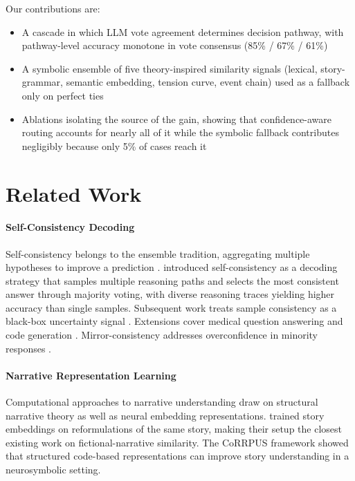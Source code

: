 \documentclass[11pt]{article}
\begin{document}
Our contributions are:
\begin{itemize}
    \item A cascade in which LLM vote agreement determines decision pathway, with pathway-level accuracy monotone in vote consensus (85\% / 67\% / 61\%)
    \item A symbolic ensemble of five theory-inspired similarity signals (lexical, story-grammar, semantic embedding, tension curve, event chain) used as a fallback only on perfect ties
    \item Ablations isolating the source of the gain, showing that confidence-aware routing accounts for nearly all of it while the symbolic fallback contributes negligibly because only 5\% of cases reach it
\end{itemize}

\section{Related Work}

\paragraph{Self-Consistency Decoding}
Self-consistency belongs to the ensemble tradition, aggregating multiple hypotheses to improve a prediction \citep{hansen2002neural}. \citet{wang2022self} introduced self-consistency as a decoding strategy that samples multiple reasoning paths and selects the most consistent answer through majority voting, with diverse reasoning traces yielding higher accuracy than single samples. Subsequent work treats sample consistency as a black-box uncertainty signal \citep{xiong2024uncertainty}. Extensions cover medical question answering \citep{maharjan2024openmedlm} and code generation \citep{huang2023enhancing}. Mirror-consistency addresses overconfidence in minority responses \citep{huang2024mirror}.

\paragraph{Narrative Representation Learning}
Computational approaches to narrative understanding draw on structural narrative theory as well as neural embedding representations. \citet{hatzel2024story} trained story embeddings on reformulations of the same story, making their setup the closest existing work on fictional-narrative similarity. The CoRRPUS framework \citep{dong2023corrpus} showed that structured code-based representations can improve story understanding in a neurosymbolic setting.
\end{document}
